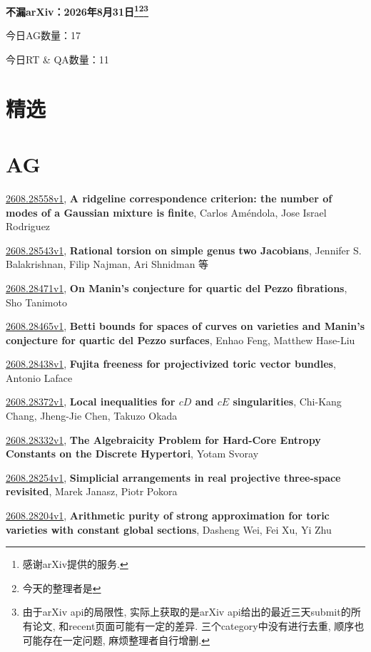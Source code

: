 \documentclass[9pt, a4paper]{article}
\theoremstyle{plain}
\theoremstyle{definition}
\theoremstyle{remark}
\newcommand{\arxiv}[3]{\href{https://arxiv.org/abs/#1}{#1}, \textbf{\textcolor{arxivblue}{#2}}, #3}
\newcommand{\AGnumber}{17}
\newcommand{\RTQAnumber}{11}
\newcommand{\NewestDate}{2026年8月31日}
\newcommand{\todayarXiver}{} %
\begin{document}
\begin{center}
    \Huge\textbf{不漏arXiv：\NewestDate\footnote{感谢arXiv提供的服务.}\footnote{今天的整理者是\todayarXiver}\footnote{由于arXiv api的局限性, 实际上获取的是arXiv api给出的最近三天submit的所有论文, 和recent页面可能有一定的差异. 三个category中没有进行去重, 顺序也可能存在一定问题, 麻烦整理者自行增删.}} \\
\end{center}

\setcounter{section}{-1}

\begin{center}
    今日AG数量：\AGnumber
    
    今日RT \& QA数量：\RTQAnumber
    
\end{center}


\section{精选}


\section{AG}
\arxiv{2608.28558v1}{A ridgeline correspondence criterion: the number of modes of a Gaussian mixture is finite}{Carlos Améndola, Jose Israel Rodriguez}

\arxiv{2608.28543v1}{Rational torsion on simple genus two Jacobians}{Jennifer S. Balakrishnan, Filip Najman, Ari Shnidman 等}

\arxiv{2608.28471v1}{On Manin's conjecture for quartic del Pezzo fibrations}{Sho Tanimoto}

\arxiv{2608.28465v1}{Betti bounds for spaces of curves on varieties and Manin's conjecture for quartic del Pezzo surfaces}{Enhao Feng, Matthew Hase-Liu}

\arxiv{2608.28438v1}{Fujita freeness for projectivized toric vector bundles}{Antonio Laface}

\arxiv{2608.28372v1}{Local inequalities for $cD$ and $cE$ singularities}{Chi-Kang Chang, Jheng-Jie Chen, Takuzo Okada}

\arxiv{2608.28332v1}{The Algebraicity Problem for Hard-Core Entropy Constants on the Discrete Hypertori}{Yotam Svoray}

\arxiv{2608.28254v1}{Simplicial arrangements in real projective three-space revisited}{Marek Janasz, Piotr Pokora}

\arxiv{2608.28204v1}{Arithmetic purity of strong approximation for toric varieties with constant global sections}{Dasheng Wei, Fei Xu, Yi Zhu}
\end{document}
